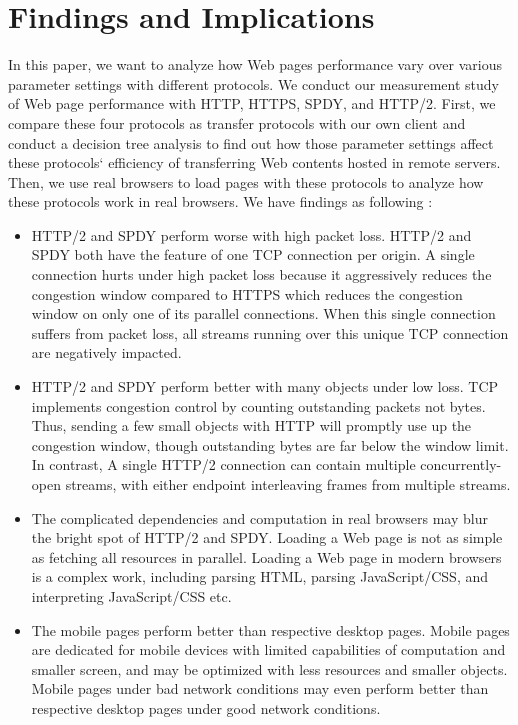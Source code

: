 \section{Findings and Implications}
In this paper, we want to analyze how Web pages performance vary over various parameter settings with different protocols. We conduct our measurement study of Web page performance with HTTP, HTTPS, SPDY, and HTTP/2. First, we compare these four protocols as transfer protocols with our own client and conduct a decision tree analysis to find out how those parameter settings affect these protocols` efficiency of transferring Web contents hosted in remote servers. Then, we use real browsers to load pages with these protocols to analyze how these protocols work in real browsers. We have findings as following :
 \begin{itemize}

    \item{HTTP/2 and SPDY perform worse with high packet loss. HTTP/2 and SPDY both have the feature of one TCP connection per origin. A single connection hurts under high packet loss because it aggressively reduces the congestion window compared to HTTPS which reduces the congestion window on only one of its parallel connections. When this single connection suffers from packet loss, all streams running over this unique TCP connection are negatively impacted.}
    
    \item{HTTP/2 and SPDY perform better with many objects under low loss. TCP implements congestion control by counting outstanding packets not bytes. Thus, sending a few small objects with HTTP will promptly use up the congestion window, though outstanding bytes are far below the window limit. In contrast, A single HTTP/2 connection can contain multiple concurrently-open streams, with either endpoint interleaving frames from multiple streams.}
    
    \item{The complicated dependencies and computation in real browsers may blur the bright spot of HTTP/2 and SPDY. Loading a Web page is not as simple as fetching all resources in parallel. Loading a Web page in modern browsers is a complex work, including parsing HTML, parsing JavaScript/CSS, and interpreting JavaScript/CSS etc.}
    
    \item{The mobile pages perform better than respective desktop pages. Mobile pages are dedicated for mobile devices with limited capabilities of computation and smaller screen, and may be optimized with less resources and smaller objects. Mobile pages under bad network conditions may even perform better than respective desktop pages under good network conditions.}
    

\end{itemize}
